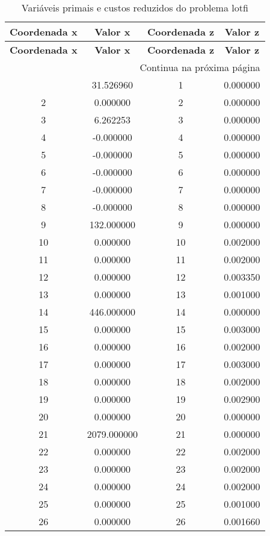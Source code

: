 \documentclass[12pt]{article}
\begin{document}
\begin{longtable}{@{}cccc@{}}
\caption{Variáveis primais e custos reduzidos do problema lotfi} \\
\toprule
\textbf{Coordenada x} & \textbf{Valor x} & \textbf{Coordenada z} & \textbf{Valor z} \\
\midrule
\endfirsthead

\toprule
\textbf{Coordenada x} & \textbf{Valor x} & \textbf{Coordenada z} & \textbf{Valor z} \\
\midrule
\endhead

\midrule \multicolumn{4}{r}{{Continua na próxima página}} \\ \midrule
\endfoot

\bottomrule
\endlastfoot
1 & 31.526960 & 1 & 0.000000 \\
2 & 0.000000 & 2 & 0.000000 \\
3 & 6.262253 & 3 & 0.000000 \\
4 & -0.000000 & 4 & 0.000000 \\
5 & -0.000000 & 5 & 0.000000 \\
6 & -0.000000 & 6 & 0.000000 \\
7 & -0.000000 & 7 & 0.000000 \\
8 & -0.000000 & 8 & 0.000000 \\
9 & 132.000000 & 9 & 0.000000 \\
10 & 0.000000 & 10 & 0.002000 \\
11 & 0.000000 & 11 & 0.002000 \\
12 & 0.000000 & 12 & 0.003350 \\
13 & 0.000000 & 13 & 0.001000 \\
14 & 446.000000 & 14 & 0.000000 \\
15 & 0.000000 & 15 & 0.003000 \\
16 & 0.000000 & 16 & 0.002000 \\
17 & 0.000000 & 17 & 0.003000 \\
18 & 0.000000 & 18 & 0.002000 \\
19 & 0.000000 & 19 & 0.002900 \\
20 & 0.000000 & 20 & 0.000000 \\
21 & 2079.000000 & 21 & 0.000000 \\
22 & 0.000000 & 22 & 0.002000 \\
23 & 0.000000 & 23 & 0.002000 \\
24 & 0.000000 & 24 & 0.002000 \\
25 & 0.000000 & 25 & 0.001000 \\
26 & 0.000000 & 26 & 0.001660 \\

\end{longtable}
\end{document}
